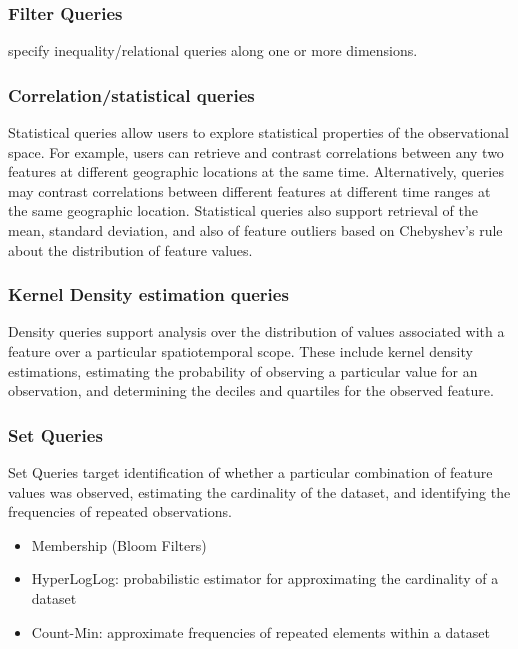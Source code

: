 \subsubsection{Filter Queries}
specify inequality/relational queries along one or more dimensions. 

\subsubsection{Correlation/statistical queries}
Statistical queries allow users to explore statistical properties of the observational space. For example, users can retrieve and contrast correlations between any two features at different geographic locations at the same time. Alternatively, queries may contrast correlations between different features at different time ranges at the same geographic location. Statistical queries also support retrieval of the mean, standard deviation, and also of feature outliers based on Chebyshev’s rule about the distribution of feature values.

\subsubsection{Kernel Density estimation queries}
Density queries support analysis over the distribution of values associated with a feature over a particular spatiotemporal scope. These include kernel density estimations, estimating the probability of observing a particular value for an observation, and determining the deciles and quartiles for the observed feature. 

\subsubsection{Set Queries}
Set Queries target identification of whether a particular combination of feature values was observed, estimating the cardinality of the dataset, and identifying the frequencies of repeated observations.
\begin{itemize}
	\item Membership (Bloom Filters)
	\item HyperLogLog: probabilistic estimator for approximating the cardinality of a dataset
	\item Count-Min: approximate frequencies of repeated elements within a dataset
\end{itemize}


